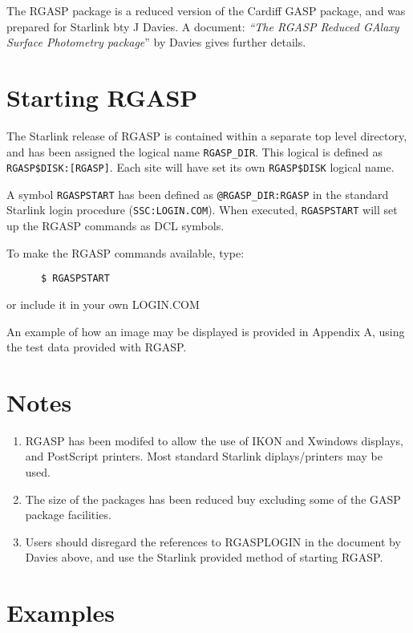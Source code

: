The RGASP package is a reduced version of the Cardiff GASP package, and was
prepared for Starlink bty J Davies. A document: {\it ``The RGASP Reduced GAlaxy
Surface Photometry package}''\/ by Davies gives further details.

\section{Starting RGASP}

The Starlink release of RGASP is contained within a separate top level
directory, and has been assigned the logical name {\tt RGASP\_DIR}. This logical
is defined as {\tt RGASP\$DISK:[RGASP]}. Each site will have set its own
{\tt RGASP\$DISK} logical name.

A symbol {\tt RGASPSTART} has been defined as {\tt @RGASP\_DIR:RGASP} in the
standard Starlink login procedure ({\tt SSC:LOGIN.COM}). When executed,
{\tt RGASPSTART} will set up the RGASP commands as DCL symbols.

To make the RGASP commands available, type:
\begin{verbatim}
      $ RGASPSTART
\end{verbatim}
or include it in your own LOGIN.COM

An example of how an image may be displayed is provided in Appendix A, using
the test data provided with RGASP.

\section{Notes}

\begin{enumerate}
\item RGASP has been modifed to allow the use of IKON and Xwindows displays,
and PostScript printers. Most standard Starlink diplays/printers may be used.

\item The size of the packages has been reduced buy 
excluding some of the GASP package facilities.

\item Users should disregard the references to RGASPLOGIN in the document by
Davies above, and use the Starlink provided method of starting RGASP.
\end{enumerate}

\pagebreak
\appendix
\section{Examples}
